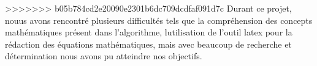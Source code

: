 \documentclass[french,a4paper,12pt]{article}
\begin{document}
>>>>>>> b05b784cd2e20090e2301b6dc709dcdfaf091d7c
\quad Durant ce projet, nouus avons rencontré plusieurs difficultés tels que la compréhension des concepts mathématiques présent dans l'algorithme, lutilisation de l'outil latex pour la rédaction des équations mathématiques, mais avec beaucoup de recherche et détermination  nous avons pu atteindre nos objectifs. 




\newpage
\begin{center}
\listoffigures
\end{center}

\newpage


\begin{center}


\end{center}
\end{document}
